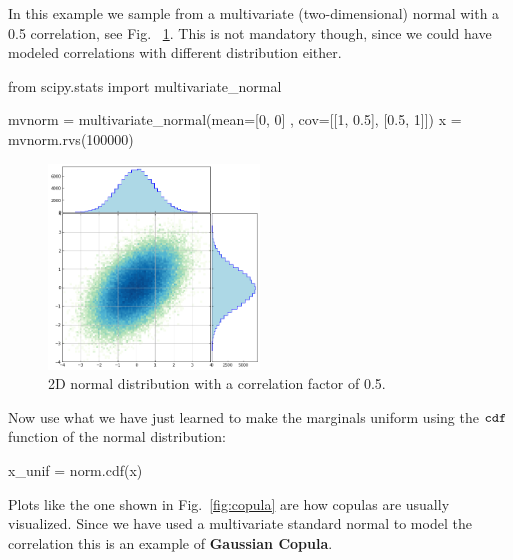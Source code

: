 In this example we sample from a multivariate (two-dimensional) normal with a 0.5 correlation, see Fig.~ \ref{fig:multivariate_with_correlation}. This is not mandatory though, since we could have modeled correlations with different distribution either.

\begin{ipython}
from scipy.stats import multivariate_normal

mvnorm = multivariate_normal(mean=[0, 0] , cov=[[1, 0.5], [0.5, 1]])
x = mvnorm.rvs(100000)
\end{ipython}

\begin{figure}[htbp]
  \centering
  \includegraphics[width=0.5\textwidth]{figures/2d_gaussian}
  \caption{2D normal distribution with a correlation factor of 0.5.}
  \label{fig:multivariate_with_correlation}
\end{figure}
    
Now use what we have just learned to make the marginals uniform using the \(\tt{cdf}\) function of the normal distribution:

\begin{ipython}
x_unif = norm.cdf(x)
\end{ipython}

Plots like the one shown in Fig.~\ref{fig:copula} are how copulas are usually visualized. Since we have used a multivariate standard normal to model the correlation this is an example of \textbf{Gaussian Copula}.

